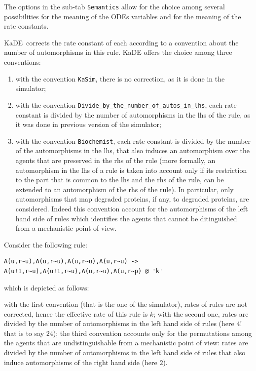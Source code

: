 \documentclass[11pt]{book}
\def\KaDE{\textsf{KaDE}}
\begin{document}
The options in the sub-tab \texttt{Semantics} allow for the choice among several possibilities for the meaning of the ODEs variables and for the meaning of the rate constants.



 \KaDE~corrects the rate constant of each  according to a convention about the number of automorphisms in this rule. {\KaDE} offers the choice among three conventions:
\begin{enumerate}
  \item with the convention \texttt{KaSim}, there is no correction, as it is done in the simulator;
  \item with the convention \texttt{Divide\_by\_the\_number\_of\_autos\_in\_lhs}, each rate constant is divided by the number of automorphisms in the lhs of the rule, as it was done in previous version of the simulator;
  \item  with the convention \texttt{Biochemist}, each rate constant is divided
  by the number of the automorphisms in the lhs, that also induces an automorphism over the agents that are preserved in the rhs of the rule (more formally, an automorphism in the lhs of a rule is taken into account only if its restriction to the part that is common to the lhs and the rhs of the rule, can be extended to an automorphism of the rhs of the rule). In particular, only automorphisms that  map degraded proteins, if any, to degraded proteins, are considered. Indeed this convention account for the automorphisms of the left hand side of rules which identifies the agents that cannot be ditinguished from a mechanistic point of view.
\end{enumerate}

  Consider the following rule:
    \begin{lstlisting}[language=kappa]
A(u,r~u),A(u,r~u),A(u,r~u),A(u,r~u) -> A(u!1,r~u),A(u!1,r~u),A(u,r~u),A(u,r~p) @ 'k'
    \end{lstlisting}
which is depicted as follows:
\begin{center}
\end{center}

  with the first convention (that is the one of the simulator), rates of rules are not corrected, hence the effective rate of this rule is $k$;
  with the second one, rates are divided by the number of automorphisms in the left hand side of rules (here $4!$ that is to say $24$); the third convention accounts only for the permutations among the agents that are undistinguishable from a mechanistic point of view: rates are divided by the number of automorphisms in the left hand side of rules that also induce automorphisms of the right hand side  (here $2$).
\end{document}
